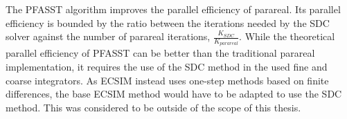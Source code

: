 
The PFASST algorithm improves the parallel efficiency of parareal. Its parallel efficiency is bounded by the ratio between the iterations needed by the SDC solver against the number of parareal iterations, $\frac{K_{SDC}}{K_{parareal}}$. While the theoretical parallel efficiency of PFASST can be better than the traditional parareal implementation, it requires the use of the SDC method in the used fine and coarse integrators. As ECSIM instead uses one-step methods based on finite differences, the base ECSIM method would have to be adapted to use the SDC method. This was considered to be outside of the scope of this thesis.

